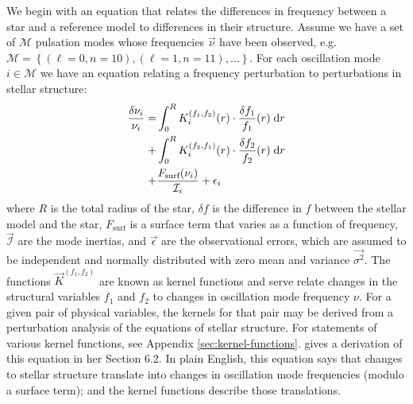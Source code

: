 \documentclass[twocolumn,twocolappendix]{aastex6}
\begin{document}
We begin with an equation that relates the differences in frequency between a star and a reference model to differences in their structure.
Assume we have a set of $\mathscr{M}$ pulsation modes whose frequencies $\vec\nu$ have been observed, e.g.~$\mathscr{M}=\left\{(\ell=0, n=10), (\ell=1, n=11), \ldots\right\}$. For each oscillation mode $i\in\mathscr{M}$ we have an equation relating a frequency perturbation to perturbations in stellar structure: 
\begin{align} \label{eq:forward}
         \frac{\delta\nu_i}{\nu_i} 
         =
         &\int_0^R K_i^{(f_1, f_2)}(r) \cdot \frac{\delta f_1}{f_1}(r) \; \text{d}r 
\notag\\+&\int_0^R K_i^{(f_2, f_1)}(r) \cdot \frac{\delta f_2}{f_2}(r) \; \text{d}r 
\notag\\+& \frac{F_\text{surf}(\nu_i)}{\mathcal{I}_i} + \epsilon_i 
\end{align}
where $R$ is the total radius of the star, $\delta f$ is the difference in $f$ between the stellar model and the star, $F_\text{surf}$ is a surface term that varies as a function of frequency, $\vec{\mathcal{I}}$ are the mode inertias, and $\vec\epsilon$ are the observational errors, which are assumed to be independent and normally distributed with zero mean and variance $\vec{\sigma^2}$. The functions $\vec{K}^{(f_1, f_2)}$ are known as kernel functions and serve relate changes in the structural variables $f_1$ and $f_2$ to changes in oscillation mode frequency $\nu$. For a given pair of physical variables, the kernels for that pair may be derived from a perturbation analysis of the equations of stellar structure. For statements of various kernel functions, see Appendix \ref{sec:kernel-functions}. %
\citet{2016LRSP...13....2B} gives a derivation of this equation in her Section 6.2.
In plain English, this equation says that changes to stellar structure translate into changes in oscillation mode frequencies (modulo a surface term); and the kernel functions describe those translations. 
\end{document}
